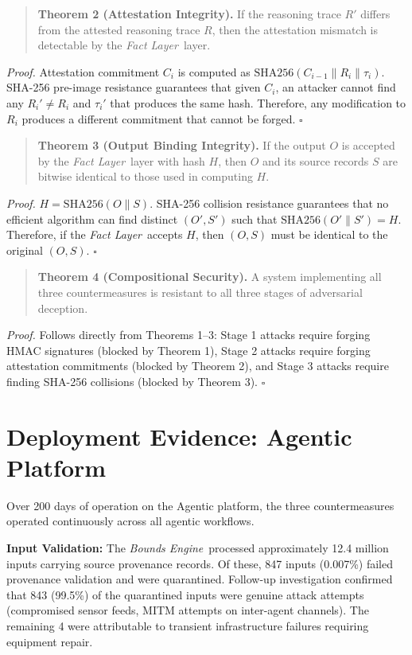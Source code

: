 \documentclass[12pt]{article}
\newcommand{\bounds}{\textit{Bounds Engine}}
\newcommand{\fact}{\textit{Fact Layer}}
\begin{document}
\begin{quote}
\textbf{Theorem 2 (Attestation Integrity).} If the reasoning trace $R'$ differs from the attested reasoning trace $R$, then the attestation mismatch is detectable by the \fact\ layer.
\end{quote}
\textit{Proof.} Attestation commitment $C_i$ is computed as $\text{SHA256}(C_{i-1} \parallel R_i \parallel \tau_i)$. SHA-256 pre-image resistance guarantees that given $C_i$, an attacker cannot find any $R_i' \neq R_i$ and $\tau_i'$ that produces the same hash. Therefore, any modification to $R_i$ produces a different commitment that cannot be forged. $\square$

\begin{quote}
\textbf{Theorem 3 (Output Binding Integrity).} If the output $O$ is accepted by the \fact\ layer with hash $H$, then $O$ and its source records $S$ are bitwise identical to those used in computing $H$.
\end{quote}
\textit{Proof.} $H = \text{SHA256}(O \parallel S)$. SHA-256 collision resistance guarantees that no efficient algorithm can find distinct $(O', S')$ such that $\text{SHA256}(O' \parallel S') = H$. Therefore, if the \fact\ accepts $H$, then $(O, S)$ must be identical to the original $(O, S)$. $\square$

\begin{quote}
\textbf{Theorem 4 (Compositional Security).} A system implementing all three countermeasures is resistant to all three stages of adversarial deception.
\end{quote}
\textit{Proof.} Follows directly from Theorems 1--3: Stage 1 attacks require forging HMAC signatures (blocked by Theorem 1), Stage 2 attacks require forging attestation commitments (blocked by Theorem 2), and Stage 3 attacks require finding SHA-256 collisions (blocked by Theorem 3). $\square$

\section{Deployment Evidence: Agentic Platform}
\label{sec:deployment}

Over 200 days of operation on the Agentic platform, the three countermeasures operated continuously across all agentic workflows.

\textbf{Input Validation:} The \bounds\ processed approximately 12.4 million inputs carrying source provenance records. Of these, 847 inputs (0.007\%) failed provenance validation and were quarantined. Follow-up investigation confirmed that 843 (99.5\%) of the quarantined inputs were genuine attack attempts (compromised sensor feeds, MITM attempts on inter-agent channels). The remaining 4 were attributable to transient infrastructure failures requiring equipment repair.
\end{document}
